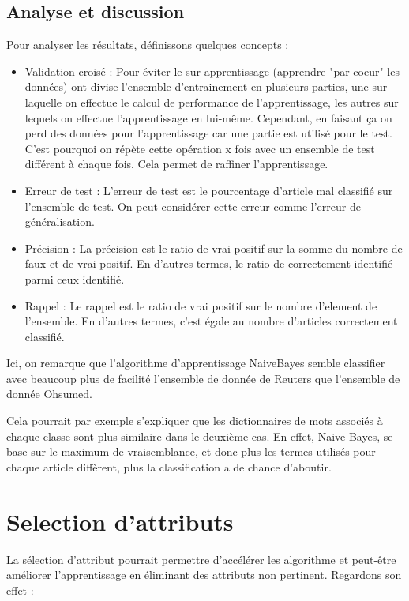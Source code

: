 \documentclass[a4paper,10pt]{article}
\begin{document}
\subsection{Analyse et discussion}

Pour analyser les résultats, définissons quelques concepts :
\begin{itemize}
	\item Validation croisé : Pour éviter le sur-apprentissage (apprendre "par coeur" les données) ont divise l'ensemble d'entrainement en plusieurs parties, une sur laquelle on effectue le calcul de performance de l'apprentissage, les autres sur lequels on effectue l'apprentissage en lui-même. Cependant, en faisant ça on perd des données pour l'apprentissage car une partie est utilisé pour le test. C'est pourquoi on répète cette opération x fois avec un ensemble de test différent à chaque fois. Cela permet de raffiner l'apprentissage.
	\item Erreur de test : L'erreur de test est le pourcentage d'article mal classifié sur l'ensemble de test. On peut considérer cette erreur comme l'erreur de généralisation.
	\item Précision : La précision est le ratio de vrai positif sur la somme du nombre de faux et de vrai positif. En d'autres termes, le ratio de correctement identifié parmi ceux identifié.
	\item Rappel : Le rappel est le ratio de vrai positif sur le nombre d'element de l'ensemble. En d'autres termes, c'est égale au nombre d'articles correctement classifié.
\end{itemize}

Ici, on remarque que l'algorithme d'apprentissage NaiveBayes semble classifier avec beaucoup plus de facilité l'ensemble de donnée de Reuters que l'ensemble de donnée Ohsumed.

Cela pourrait par exemple s'expliquer que les dictionnaires de mots associés à chaque classe sont plus similaire dans le deuxième cas. En effet, Naive Bayes, se base sur le maximum de vraisemblance, et donc plus les termes utilisés pour chaque article diffèrent, plus la classification a de chance d'aboutir.

\section{Selection d'attributs}

La sélection d'attribut pourrait permettre d'accélérer les algorithme et peut-être améliorer l'apprentissage en éliminant des attributs non pertinent. Regardons son effet :
\end{document}
